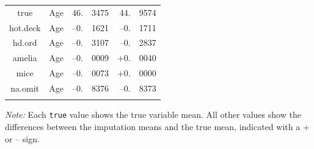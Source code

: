 \documentclass[12pt,econ]{sources/authesis}
\begin{document}
\begin{table}[H]
\begin{threeparttable}
\begin{tabular}{ccr@{}lr@{}l}
 true & Age & 46.&3475 & 44.&9574 \\
 hot.deck & Age & --0.&1621 & --0.&1711 \\ 
 hd.ord & Age & --0.&3107 & --0.&2837 \\
 amelia & Age & --0.&0009 & +0.&0040 \\
 mice & Age & --0.&0073 & +0.&0000 \\ 
 na.omit & Age & --0.&8376 & --0.&8373 \\
 \hline \\[-1.8ex] 
\end{tabular} 
\begin{tablenotes}
\footnotesize{\textit{Note:} Each \texttt{true} value shows the true variable mean. All other values show the differences between the imputation means and the true mean, indicated with a + or -- sign.}
\end{tablenotes}
\end{threeparttable}
\end{table}
\end{document}
